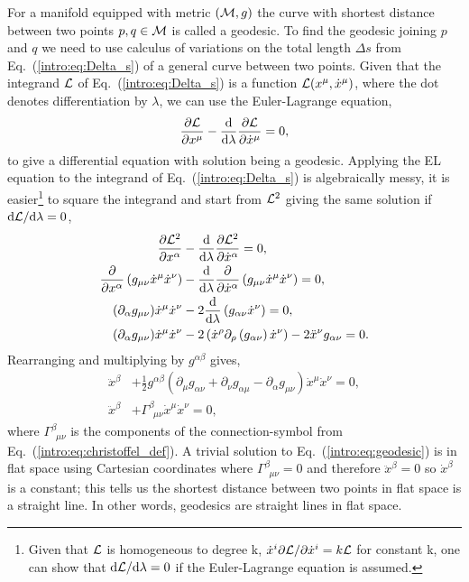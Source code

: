  For a manifold equipped with metric $(\mathcal{M},g)$ the curve with shortest distance between two points $p,q\in\mathcal{M}$ is called a geodesic. To find the geodesic joining $p$ and $q$ we need to use calculus of variations on the total length $\Delta s$ from Eq.~(\ref{intro:eq:Delta_s}) of a general curve between two points. Given that the integrand $\mathcal{L}$ of Eq.~(\ref{intro:eq:Delta_s}) is a function $\mathcal{L}(x^\mu,\dot{x}^\mu)$, where the dot denotes differentiation by $\lambda$, we can use the Euler-Lagrange equation,
\begin{align}
\frac{\partial{\mathcal{L}}}{\partial x^\mu} - \frac{\dd}{\dd \lambda}\frac{\partial \mathcal{L}}{\partial \dot{x}^\mu} = 0,
\end{align}
to give a differential equation with solution being a geodesic. Applying the EL equation to the integrand of Eq.~(\ref{intro:eq:Delta_s}) is algebraically messy, it is easier\footnote{Given that $\mathcal{L}$ is homogeneous to degree k, $\dot{x}^i \partial \mathcal{L} / \partial \dot{x}^i = k\mathcal{L}$ for constant k, one can show that $\dd\mathcal{L}/\dd\lambda=0$ if the Euler-Lagrange equation is assumed.} to square the integrand and start from $\mathcal{L}^2$ giving the same solution if $\dd \mathcal{L} / \dd \lambda=0$, 
\begin{align}
\frac{\partial{\mathcal{L}^2}}{\partial x^\alpha} &- \frac{\dd}{\dd \lambda}\frac{\partial \mathcal{L}^2}{\partial \dot{x}^\alpha} = 0, \\
\frac{\partial}{\partial x^\alpha} \left(g_{\mu\nu}\dot{x}^\mu\dot{x}^\nu\right) &- \frac{\dd}{\dd \lambda}\frac{\partial }{\partial \dot{x}^\alpha}\left(g_{\mu\nu}\dot{x}^\mu\dot{x}^\nu\right) = 0, \\
(\partial_\alpha g_{\mu\nu})\dot{x}^\mu\dot{x}^\nu &- 2\frac{\dd}{\dd \lambda}\left(g_{\alpha\nu}\dot{x}^\nu\right) = 0, \\
(\partial_\alpha g_{\mu\nu})\dot{x}^\mu\dot{x}^\nu &- 2\left(\dot{x}^\rho \partial_\rho \left(g_{\alpha\nu}\right)\dot{x}^\nu\right) - 2\ddot{x}^\nu g_{\alpha\nu} =0. 
\end{align}
Rearranging and multiplying by $g^{\alpha\beta}$ gives,
\begin{align}
\ddot{x}^\beta &+ \frac{1}{2}g^{\alpha\beta}\left(\partial_{\mu}g_{\alpha\nu} +\partial_{\nu}g_{\alpha\mu} -\partial_{\alpha}g_{\mu\nu} \right)\dot{x}^\mu\dot{x}^\nu=0,\\
 \ddot{x}^\beta &+ \Gamma^\beta_{\,\,\,\mu\nu}\dot{x}^\mu\dot{x}^\nu=0, \label{intro:eq:geodesic}
\end{align}
where $\Gamma^\beta_{\,\,\,\mu\nu}$ is the components of the connection-symbol from Eq.~(\ref{intro:eq:christoffel_def}). A trivial solution to Eq.~(\ref{intro:eq:geodesic}) is in flat space using Cartesian coordinates where $\Gamma^\beta_{\,\,\,\mu\nu}=0$ and therefore $\ddot{x}^\beta=0$ so $\dot{x}^\beta$ is a constant; this tells us the shortest distance between two points in flat space is a straight line. In other words, geodesics are straight lines in flat space.


